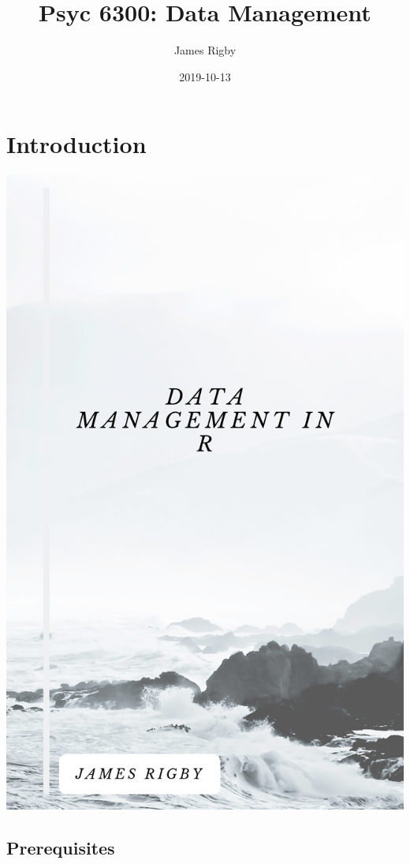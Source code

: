 \documentclass[]{book}
\title{Psyc 6300: Data Management}
\author{James Rigby}
\date{2019-10-13}
\theoremstyle{definition}
\theoremstyle{definition}
\theoremstyle{definition}
\theoremstyle{remark}
\begin{document}
\maketitle

{
\setcounter{tocdepth}{1}
\tableofcontents
}
\hypertarget{introduction}{%
\chapter{Introduction}\label{introduction}}

\includegraphics[width=19.58in]{suppl/cover}

\hypertarget{prerequisites}{%
\section{Prerequisites}\label{prerequisites}}
\end{document}
